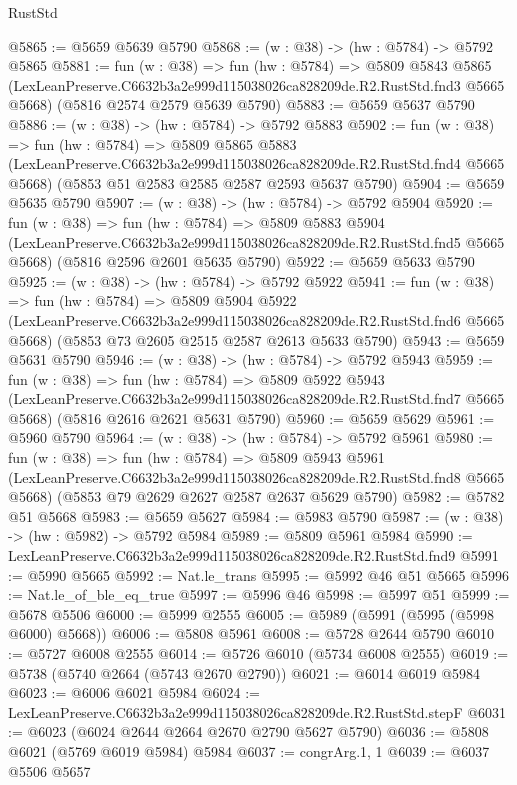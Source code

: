 \begin{lexlean}{RustStd}
\begin{coremodule}
@5865 := @5659 @5639 @5790
@5868 := (w : @38) -> (hw : @5784) -> @5792 @5865
@5881 := fun (w : @38) =>
  fun (hw : @5784) =>
  @5809
    @5843
    @5865
    (LexLeanPreserve.C6632b3a2e999d115038026ca828209de.R2.RustStd.fnd3 @5665 @5668)
    (@5816 @2574 @2579 @5639 @5790)
@5883 := @5659 @5637 @5790
@5886 := (w : @38) -> (hw : @5784) -> @5792 @5883
@5902 := fun (w : @38) =>
  fun (hw : @5784) =>
  @5809
    @5865
    @5883
    (LexLeanPreserve.C6632b3a2e999d115038026ca828209de.R2.RustStd.fnd4 @5665 @5668)
    (@5853 @51 @2583 @2585 @2587 @2593 @5637 @5790)
@5904 := @5659 @5635 @5790
@5907 := (w : @38) -> (hw : @5784) -> @5792 @5904
@5920 := fun (w : @38) =>
  fun (hw : @5784) =>
  @5809
    @5883
    @5904
    (LexLeanPreserve.C6632b3a2e999d115038026ca828209de.R2.RustStd.fnd5 @5665 @5668)
    (@5816 @2596 @2601 @5635 @5790)
@5922 := @5659 @5633 @5790
@5925 := (w : @38) -> (hw : @5784) -> @5792 @5922
@5941 := fun (w : @38) =>
  fun (hw : @5784) =>
  @5809
    @5904
    @5922
    (LexLeanPreserve.C6632b3a2e999d115038026ca828209de.R2.RustStd.fnd6 @5665 @5668)
    (@5853 @73 @2605 @2515 @2587 @2613 @5633 @5790)
@5943 := @5659 @5631 @5790
@5946 := (w : @38) -> (hw : @5784) -> @5792 @5943
@5959 := fun (w : @38) =>
  fun (hw : @5784) =>
  @5809
    @5922
    @5943
    (LexLeanPreserve.C6632b3a2e999d115038026ca828209de.R2.RustStd.fnd7 @5665 @5668)
    (@5816 @2616 @2621 @5631 @5790)
@5960 := @5659 @5629
@5961 := @5960 @5790
@5964 := (w : @38) -> (hw : @5784) -> @5792 @5961
@5980 := fun (w : @38) =>
  fun (hw : @5784) =>
  @5809
    @5943
    @5961
    (LexLeanPreserve.C6632b3a2e999d115038026ca828209de.R2.RustStd.fnd8 @5665 @5668)
    (@5853 @79 @2629 @2627 @2587 @2637 @5629 @5790)
@5982 := @5782 @51 @5668
@5983 := @5659 @5627
@5984 := @5983 @5790
@5987 := (w : @38) -> (hw : @5982) -> @5792 @5984
@5989 := @5809 @5961 @5984
@5990 := LexLeanPreserve.C6632b3a2e999d115038026ca828209de.R2.RustStd.fnd9
@5991 := @5990 @5665
@5992 := Nat.le_trans
@5995 := @5992 @46 @51 @5665
@5996 := Nat.le_of_ble_eq_true
@5997 := @5996 @46
@5998 := @5997 @51
@5999 := @5678 @5506
@6000 := @5999 @2555
@6005 := @5989 (@5991 (@5995 (@5998 @6000) @5668))
@6006 := @5808 @5961
@6008 := @5728 @2644 @5790
@6010 := @5727 @6008 @2555
@6014 := @5726 @6010 (@5734 @6008 @2555)
@6019 := @5738 (@5740 @2664 (@5743 @2670 @2790))
@6021 := @6014 @6019 @5984
@6023 := @6006 @6021 @5984
@6024 := LexLeanPreserve.C6632b3a2e999d115038026ca828209de.R2.RustStd.stepF
@6031 := @6023 (@6024 @2644 @2664 @2670 @2790 @5627 @5790)
@6036 := @5808 @6021 (@5769 @6019 @5984) @5984
@6037 := congrArg.{1, 1}
@6039 := @6037 @5506 @5657

\end{coremodule}
\end{lexlean}
